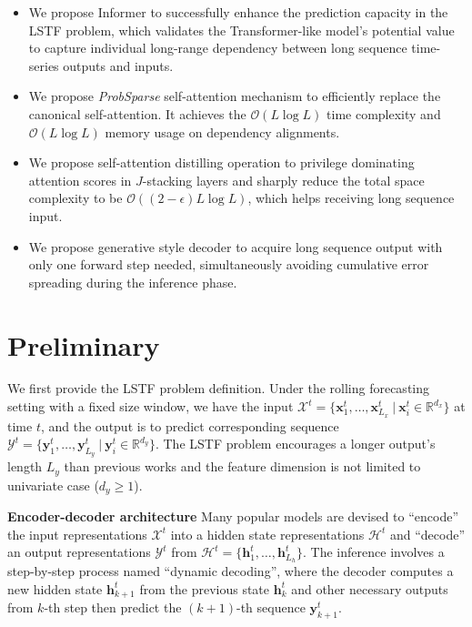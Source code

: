 \documentclass[letterpaper]{article} %
\newcommand{\mb}{\mathbf}
\newcommand{\bigO}{\mathcal{O}}
\newcommand{\mn}{Informer}
\begin{document}
\begin{itemize}[nosep, leftmargin=0.45cm]
\item We propose {\mn} to successfully enhance the prediction capacity in the LSTF problem, which validates the Transformer-like model's potential value to capture individual long-range dependency between long sequence time-series outputs and inputs.
\item We propose \emph{ProbSparse} self-attention mechanism to efficiently replace the canonical self-attention. It achieves the $\bigO(L \log L)$ time complexity and $\bigO(L \log L)$ memory usage on dependency alignments.
\item We propose self-attention distilling operation to privilege dominating attention scores in $J$-stacking layers and sharply reduce the total space complexity to be $\bigO((2-\epsilon)L \log L)$, which helps receiving long sequence input.
\item We propose generative style decoder to acquire long sequence output with only one forward step needed, simultaneously avoiding cumulative error spreading during the inference phase.
\end{itemize}

\section{Preliminary}
\label{sec:method}

We first provide the LSTF problem definition.
Under the rolling forecasting setting with a fixed size window, we have the input $\mathcal{X}^t=\{\mb{x}^t_1,\ldots,\mb{x}^t_{L_x} ~|~ \mb{x}^t_{i} \in \mathbb{R}^{d_{x}}\}$ at time $t$, and the output is to predict corresponding sequence $\mathcal{Y}^t=\{\mb{y}^t_1,\ldots,\mb{y}^t_{L_y} ~|~ \mb{y}^t_{i} \in \mathbb{R}^{d_{y}} \}$. The LSTF problem encourages a longer output's length $L_y$ than previous works \cite{cho2014properties,sutskever2014sequence} and the feature dimension is not limited to univariate case ($d_{y} \geq 1$).

\textbf{Encoder-decoder architecture}
Many popular models are devised to ``encode'' the input representations $\mathcal{X}^t$ into a hidden state representations $\mathcal{H}^t$ and ``decode'' an output representations $\mathcal{Y}^t$ from $\mathcal{H}^t=\{\mb{h}^t_1,\ldots,\mb{h}^t_{L_h}\}$. The inference involves a step-by-step process named ``dynamic decoding'', where the decoder computes a new hidden state $\mb{h}^t_{k+1}$ from the previous state $\mb{h}^t_{k}$ and other necessary outputs from $k$-th step then predict the $(k+1)$-th sequence $\mb{y}^t_{k+1}$.
\end{document}
